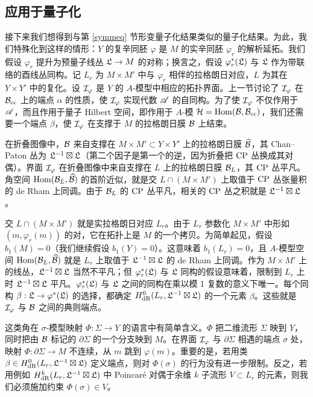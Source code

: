 \subsection{应用于量子化}\label{qtz}

接下来我们想得到与第 \ref{symmeq} 节形变量子化结果类似的量子化结果。为此，我们特殊化到这样的情形：$Y$ 的复辛同胚 $\varphi$ 是 $M$ 的实辛同胚 $\varphi_r$ 的解析延拓。我们假设 $\varphi_r$ 提升为预量子线丛 ${\mathfrak L}\to M$ 的对称；换言之，假设 $\varphi_r^*({\mathfrak L})$ 与 ${\mathfrak L}$ 作为带联络的酉线丛同构。记 $L_r$ 为 $M\times M'$ 中与 $\varphi_r$ 相伴的拉格朗日对应，$L$ 为其在 $Y\times Y'$ 中的复化。设 ${\mathcal I}_\varphi$ 是 $Y$ 的 $A$-模型中相应的拓扑界面。上一节讨论了 ${\mathcal I}_\varphi$ 在 ${\mathcal B}_{\mathrm{cc}}$ 上的端点 $\alpha$ 的性质，使 ${\mathcal I}_\varphi$ 实现代数 ${\mathscr A}$ 的自同构。为了使 ${\mathcal I}_\varphi$ 不仅作用于 ${\mathscr A}$，而且作用于量子 Hilbert 空间，即作用于 $A$-模 ${\mathcal H}={\mathrm{Hom}}({\mathcal B},{\mathcal B}_{\mathrm{cc}})$，我们还需要一个端点 $\beta$，使 ${\mathcal I}_\varphi$ 在支撑于 $M$ 的拉格朗日膜 ${\mathcal B}$ 上结束。

在折叠图像中，${\mathcal B}$ 来自支撑在 $M\times M'\subset Y\times Y'$ 上的拉格朗日膜 $\widehat{{\mathcal B}}$，其 Chan--Paton 丛为 ${\mathfrak L}^{-1}\boxtimes{\mathfrak L}$（第二个因子是第一个的逆，因为折叠把 ${\mathrm{CP}}$ 丛换成其对偶）。界面 ${\mathcal I}_\varphi$ 在折叠图像中来自支撑在 $L$ 上的拉格朗日膜 ${\mathcal B}_L$，其 ${\mathrm{CP}}$ 丛平凡。角空间 ${\mathrm{Hom}}({\mathcal B}_L,\widehat{{\mathcal B}})$ 的首阶近似，就是交 $L\cap(M\times M')$ 上取值于 ${\mathrm{CP}}$ 丛张量积的 de Rham 上同调。由于 ${\mathcal B}_L$ 的 ${\mathrm{CP}}$ 丛平凡，相关的 ${\mathrm{CP}}$ 丛之积就是 ${\mathfrak L}^{-1}\boxtimes{\mathfrak L}$。

交 $L\cap(M\times M')$ 就是实拉格朗日对应 $L_r$。由于 $L_r$ 参数化 $M\times M'$ 中形如 $(m,\varphi_r(m))$ 的对，它在拓扑上是 $M$ 的一个拷贝。为简单起见，假设 $b_1(M)=0$（我们继续假设 $b_1(Y)=0$）。这意味着 $b_1(L_r)=0$，且 $A$-模型空间 ${\mathrm{Hom}}({\mathcal B}_L,\widehat{{\mathcal B}})$ 就是 $L_r$ 上取值于 ${\mathfrak L}^{-1}\boxtimes{\mathfrak L}$ 的 de Rham 上同调。作为 $M\times M'$ 上的线丛，${\mathfrak L}^{-1}\boxtimes{\mathfrak L}$ 当然不平凡；但 $\varphi_r^*({\mathfrak L})$ 与 ${\mathfrak L}$ 同构的假设意味着，限制到 $L_r$ 上时 ${\mathfrak L}^{-1}\boxtimes{\mathfrak L}$ 平凡。$\varphi_r^*({\mathfrak L})$ 与 ${\mathfrak L}$ 之间的同构在乘以模 1 复数的意义下唯一。每个同构 $\beta:{\mathfrak L}\to\varphi^*({\mathfrak L})$ 的选择，都确定 $H^0_{\mathrm{dR}}(L_r,{\mathfrak L}^{-1}\boxtimes{\mathfrak L})$ 的一个元素 $\beta$。这些就是 ${\mathcal I}_\varphi$ 与 ${\mathcal B}$ 之间的典则端点。

这类角在 $\sigma$-模型映射 $\Phi:\Sigma\to Y$ 的语言中有简单含义。$\Phi$ 把二维流形 $\Sigma$ 映到 $Y$，同时把由 ${\mathcal B}$ 标记的 $\partial\Sigma$ 的一个分支映到 $M$。在界面 ${\mathcal I}_\varphi$ 与 $\partial\Sigma$ 相遇的端点 $\sigma$ 处，映射 $\Phi:\partial\Sigma\to M$ 不连续，从 $m$ 跳到 $\varphi(m)$。重要的是，若用类 $\beta\in H^0_{\mathrm{dR}}(L_r,{\mathfrak L}^{-1}\boxtimes{\mathfrak L})$ 定义端点，则对 $\Phi(\sigma)$ 的行为没有进一步限制。反之，若用例如 $H^k_{\mathrm{dR}}(L_r,{\mathfrak L}^{-1}\boxtimes{\mathfrak L})$ 中 Poincaré 对偶于余维 $k$ 子流形 $V\subset L_r$ 的元素，则我们必须施加约束 $\Phi(\sigma)\in V$。

